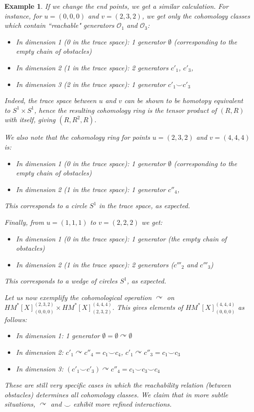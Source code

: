 \documentclass{article}
\newtheorem{example}[definition]{Example} %
\begin{document}
\begin{example}
If we change the end points, we get a similar calculation. For instance, for $u=(0,0,0)$ and $v=(2,3,2)$, 
we get only the cohomology classes which contain ``reachable" generators $\mathcal{O}_1$ and $\mathcal{O}_3$: 
\begin{itemize}
\item In dimension 1 (0 in the trace space): 1 generator $\emptyset$ (corresponding to the empty chain of obstacles)
    \item In dimension 2 (1 in the trace space): 2 generators $c'_1$, $c'_3$,
\item In dimension 3 (2 in the trace space): 1 generator $c'_1 \smile c'_3$
\end{itemize}

Indeed, the trace space between $u$ and $v$ can be shown to be homotopy equivalent to 
$S^1 \times S^1$, hence the resulting cohomology ring is the tensor product of 
$(R,R)$ with itself, giving $(R,R^2, R)$. 

We also note that the cohomology ring for points $u=(2,3,2)$ and $v=(4,4,4)$ is:
\begin{itemize}
\item In dimension 1 (0 in the trace space): 1 generator $\emptyset$ (corresponding to the empty chain of obstacles)
    \item In dimension 2 (1 in the trace space): 1 generator $c''_4$,
\end{itemize}
This corresponds to a circle $S^1$ in the trace space, as expected. 

{Finally, from $u=(1,1,1)$ to $v=(2,2,2)$ we get:}
\begin{itemize}
\item In dimension 1 (0 in the trace space): 1 generator (the empty chain of obstacles)
\item In dimension 2 (1 in the trace space): 2 generators ($c'''_2$ and $c'''_3$)
\end{itemize}
This corresponds to a wedge of circles $S^1$, as expected. 

Let us now exemplify the cohomological operation $\curvearrowright$ on $HM^*[X]^{(2,3,2)}_{(0,0,0)}\times HM^*[X]^{(4,4,4)}_{(2,3,2)}$. 
This gives elements of $HM^*[X]^{(4,4,4)}_{(0,0,0)}$ as follows:
\begin{itemize}
\item In dimension 1: 1 generator $\emptyset=\emptyset \curvearrowright \emptyset$
\item In dimension 2: $c'_1\curvearrowright c''_4=c_1\smile c_4$, $c'_1\curvearrowright c''_3=c_1\smile c_3$
\item In dimension 3: $(c'_1\smile c'_3)\curvearrowright c''_4=c_1\smile c_3\smile c_4$
\end{itemize}

These are still very specific cases in which the reachability relation (between obstacles) determines all cohomology classes. We claim that in more subtle situations, $\curvearrowright$ and $\smile$ exhibit more refined interactions. 
\end{example}




\end{document}
